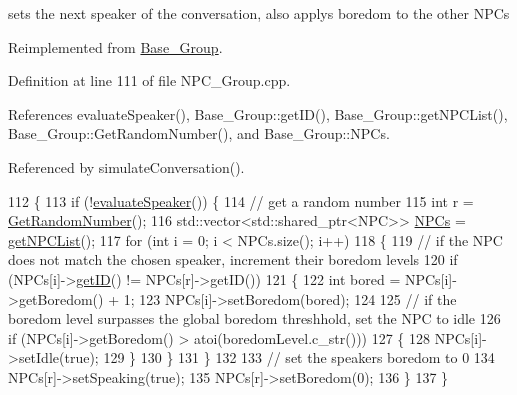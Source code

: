 set\textquotesingle{}s the next speaker of the conversation, also applys boredom to the other N\+P\+Cs 

Reimplemented from \hyperlink{class_base___group_ae35b3719076cf40d6577b4ae3779758c}{Base\+\_\+\+Group}.



Definition at line 111 of file N\+P\+C\+\_\+\+Group.\+cpp.



References evaluate\+Speaker(), Base\+\_\+\+Group\+::get\+I\+D(), Base\+\_\+\+Group\+::get\+N\+P\+C\+List(), Base\+\_\+\+Group\+::\+Get\+Random\+Number(), and Base\+\_\+\+Group\+::\+N\+P\+Cs.



Referenced by simulate\+Conversation().


\begin{DoxyCode}
112 \{
113     \textcolor{keywordflow}{if} (!\hyperlink{class_n_p_c___group_a2e0b8772b42985bd7e87359013918601}{evaluateSpeaker}()) \{
114         \textcolor{comment}{// get a random number}
115         \textcolor{keywordtype}{int} r = \hyperlink{class_base___group_a3864a2806457151363344051f2814389}{GetRandomNumber}();
116         std::vector<std::shared\_ptr<NPC>> \hyperlink{class_base___group_a4757f3c06c73eea029f71b871c1d863e}{NPCs} = \hyperlink{class_base___group_a75eec9132aaf532b4429e0af76b31775}{getNPCList}();
117         \textcolor{keywordflow}{for} (\textcolor{keywordtype}{int} i = 0; i < NPCs.size(); i++)
118         \{
119             \textcolor{comment}{// if the NPC does not match the chosen speaker, increment their boredom levels}
120             \textcolor{keywordflow}{if} (NPCs[i]->\hyperlink{class_base___group_a7299ae154b26d741ac2f6f794bc3a544}{getID}() != NPCs[r]->getID())
121             \{
122                 \textcolor{keywordtype}{int} bored = NPCs[i]->getBoredom() + 1;
123                 NPCs[i]->setBoredom(bored);
124 
125                 \textcolor{comment}{// if the boredom level surpasses the global boredom threshhold, set the NPC to idle}
126                 \textcolor{keywordflow}{if} (NPCs[i]->getBoredom() > atoi(boredomLevel.c\_str()))
127                 \{
128                     NPCs[i]->setIdle(\textcolor{keyword}{true});
129                 \}
130             \}
131         \}
132 
133         \textcolor{comment}{// set the speakers boredom to 0}
134         NPCs[r]->setSpeaking(\textcolor{keyword}{true});
135         NPCs[r]->setBoredom(0);
136     \}
137 \}
\end{DoxyCode}
\mbox{\label{class_n_p_c___group_a139f16a36dba893743e227ea276fd5e7}} 

